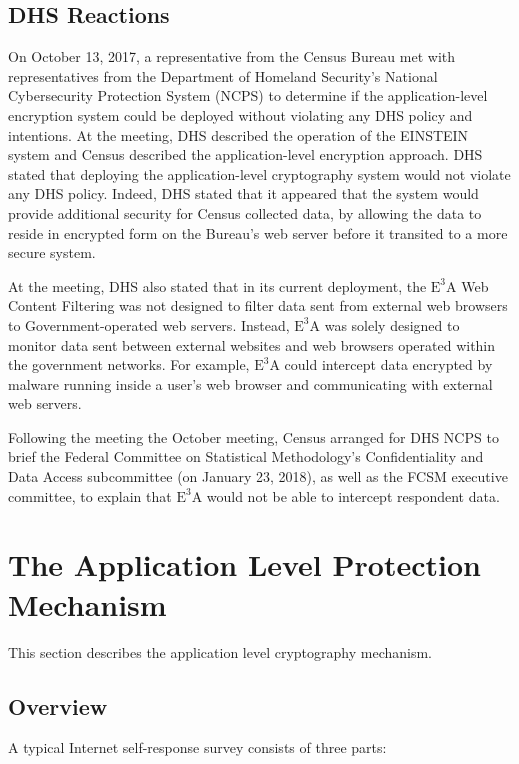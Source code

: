 \documentclass[fleqn,10pt]{wlscirep}
\newcommand{\ETA}{$\textrm{E}^\textrm{3}\textrm{A}$\xspace}
\begin{document}
\subsection{DHS Reactions}

On October 13, 2017, a representative from the Census Bureau met with representatives from the
Department of Homeland Security's National Cybersecurity Protection
System (NCPS) to determine if the application-level encryption system
could be deployed without violating any DHS policy and intentions. At
the meeting, DHS described the operation of the EINSTEIN system and
Census described the application-level encryption approach. DHS stated
that deploying the application-level cryptography system would not violate any
DHS policy. Indeed, DHS stated that it appeared that the system would
provide additional security for Census collected data, by allowing the
data to reside in encrypted form on the Bureau's web server before it
transited to a more secure system.

At the meeting, DHS also stated that in its current deployment, the \ETA Web Content Filtering
was not designed to filter data sent from external web browsers to
Government-operated web servers. Instead, \ETA was solely designed to
monitor data sent between external websites and web browsers operated
within the government networks. For example, \ETA could intercept data
encrypted by malware running inside a user's web browser and
communicating with external web servers.

Following the meeting the October meeting, Census arranged for DHS
NCPS to brief the Federal Committee on Statistical Methodology's
Confidentiality and Data Access subcommittee (on January 23, 2018), as
well as the FCSM executive committee, to explain that \ETA would not
be able to intercept respondent data.



\section{The Application Level Protection Mechanism}

This section describes the application level cryptography mechanism.

\subsection{Overview}

A typical Internet self-response survey consists of three parts:
\end{document}
